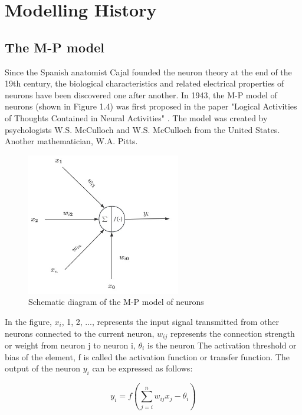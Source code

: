 \documentclass[12pt,a4paper]{report}
\begin{document}
\chapter{Modelling History}

\section{The M-P model}
Since the Spanish anatomist Cajal founded the neuron theory at the end of the 19th century, the biological characteristics and related electrical properties of neurons have been discovered one after another. In 1943, the M-P model of neurons (shown in Figure 1.4) was first proposed in the paper "Logical Activities of Thoughts Contained in Neural Activities" \cite{Mcculloch1854LOGICALCALCULUSIDEAS}. The model was created by psychologists W.S. McCulloch and W.S. McCulloch from the United States. Another mathematician, W.A. Pitts.

\begin{figure}[H]
    \centering
    \includegraphics[width=0.6\textwidth]{./data/M-P.jpg}
    \caption{Schematic diagram of the M-P model of neurons}
    \label{fig:my_picture}
    \vspace{1pt} %
\end{figure}

In the figure, $x_i$, 1, 2, ..., represents the input signal transmitted from other neurons connected to the current neuron, $w_{ij}$ represents the connection strength or weight from neuron j to neuron i, $\theta_i$ is the neuron The activation threshold or bias of the element, f is called the activation function or transfer function. The output of the neuron $y_i$ can be expressed as follows:

\begin{equation}
    y_i = f(\sum_{j=i}^{n} w_{ij}x_j-\theta_i)
\end{equation}
\end{document}
